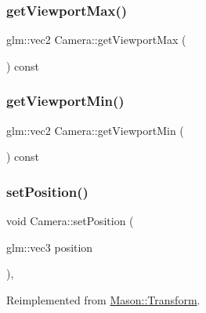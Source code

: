 \subsubsection{\texorpdfstring{get\+Viewport\+Max()}{getViewportMax()}}
{\footnotesize\ttfamily glm\+::vec2 Camera\+::get\+Viewport\+Max (\begin{DoxyParamCaption}{ }\end{DoxyParamCaption}) const}

\hypertarget{class_mason_1_1_camera_a0d2d26d8b7b80ab508ed4f4f537614b5}{}\label{class_mason_1_1_camera_a0d2d26d8b7b80ab508ed4f4f537614b5} 
\subsubsection{\texorpdfstring{get\+Viewport\+Min()}{getViewportMin()}}
{\footnotesize\ttfamily glm\+::vec2 Camera\+::get\+Viewport\+Min (\begin{DoxyParamCaption}{ }\end{DoxyParamCaption}) const}

\hypertarget{class_mason_1_1_camera_a69f184af46d081b85209040bbe814cbb}{}\label{class_mason_1_1_camera_a69f184af46d081b85209040bbe814cbb} 
\subsubsection{\texorpdfstring{set\+Position()}{setPosition()}}
{\footnotesize\ttfamily void Camera\+::set\+Position (\begin{DoxyParamCaption}\item[{glm\+::vec3}]{position }\end{DoxyParamCaption})\hspace{0.3cm}{\ttfamily [override]}, {\ttfamily [virtual]}}



Reimplemented from \hyperlink{class_mason_1_1_transform_a740f389e20c0190c52bcb893aeaa0490}{Mason\+::\+Transform}.

\hypertarget{class_mason_1_1_camera_af7aa6752699108d282996199549a704b}{}\label{class_mason_1_1_camera_af7aa6752699108d282996199549a704b} 
